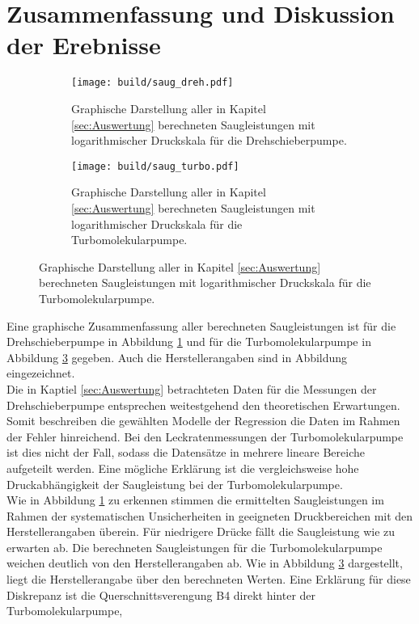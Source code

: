 \section{Zusammenfassung und Diskussion der Erebnisse}
\label{sec:Diskussion}
\begin{figure}[ht]
    \begin{subfigure}{0.8\textwidth}
            \centering
            \texttt{[image: build/saug\_dreh.pdf]}
            \caption{Graphische Darstellung aller in Kapitel \ref{sec:Auswertung} berechneten Saugleistungen mit logarithmischer Druckskala für die Drehschieberpumpe.}
            \label{fig:saug_dreh}
    \end{subfigure}
    \hfill
    \begin{subfigure}{0.8\textwidth}
            \centering
            \texttt{[image: build/saug\_turbo.pdf]}
            \caption{Graphische Darstellung aller in Kapitel \ref{sec:Auswertung} berechneten Saugleistungen mit logarithmischer Druckskala für die Turbomolekularpumpe.}
            \label{fig:saug_turbo}
    \end{subfigure}
\end{figure}
Eine graphische Zusammenfassung aller berechneten Saugleistungen ist für die Drehschieberpumpe in 
Abbildung \ref{fig:saug_dreh} und für die Turbomolekularpumpe in Abbildung \ref{fig:saug_turbo} 
gegeben. Auch die Herstellerangaben sind in Abbildung eingezeichnet.
\\
Die in Kaptiel \ref{sec:Auswertung} betrachteten Daten für die Messungen der Drehschieberpumpe 
entsprechen weitestgehend den theoretischen Erwartungen. Somit beschreiben die gewählten 
Modelle der Regression die Daten im Rahmen der Fehler hinreichend. Bei den Leckratenmessungen
der Turbomolekularpumpe ist dies nicht der Fall, sodass die Datensätze in mehrere lineare
Bereiche aufgeteilt werden. Eine mögliche Erklärung ist die vergleichsweise hohe Druckabhängigkeit 
der Saugleistung bei der Turbomolekularpumpe. 
\\
Wie in Abbildung \ref{fig:saug_dreh} zu erkennen stimmen die ermittelten Saugleistungen im Rahmen 
der systematischen Unsicherheiten in geeigneten Druckbereichen mit den Herstellerangaben überein.
Für niedrigere Drücke fällt die Saugleistung wie zu erwarten ab. 
Die berechneten Saugleistungen für die Turbomolekularpumpe weichen deutlich von den Herstellerangaben
ab. Wie in Abbildung \ref{fig:saug_turbo} dargestellt, liegt die Herstellerangabe über den berechneten Werten.
Eine Erklärung für diese Diskrepanz ist die Querschnittsverengung B4 direkt hinter der Turbomolekularpumpe,
